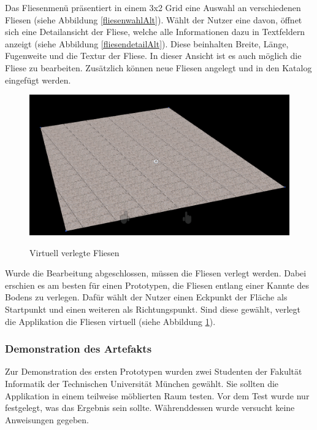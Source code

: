 Das Fliesenmenü präsentiert in einem 3x2 Grid eine Auswahl an verschiedenen Fliesen (siehe Abbildung \ref{fliesenwahlAlt}). Wählt der Nutzer eine davon, öffnet sich eine Detailansicht der Fliese, welche alle Informationen dazu in Textfeldern anzeigt (siehe Abbildung \ref{fliesendetailAlt}). Diese beinhalten Breite, Länge, Fugenweite und die Textur der Fliese. In dieser Ansicht ist es auch möglich die Fliese zu bearbeiten. Zusätzlich können neue Fliesen angelegt und in den Katalog eingefügt werden.

\begin{figure}[h]
	\begin{center}
		\noindent\includegraphics[scale=0.4]{Resources/Artefakt/bodenVerlegt.png}
		\label{bodenVerl}
		\caption{Virtuell verlegte Fliesen}	
	\end{center}
\end{figure}

Wurde die Bearbeitung abgeschlossen, müssen die Fliesen verlegt werden. Dabei erschien es am besten für einen Prototypen, die Fliesen entlang einer Kannte des Bodens zu verlegen. Dafür wählt der Nutzer einen Eckpunkt der Fläche als Startpunkt und einen weiteren als Richtungspunkt. Sind diese gewählt, verlegt die Applikation die Fliesen virtuell (siehe Abbildung \ref{bodenVerl}).

\subsubsection{Demonstration des Artefakts}

Zur Demonstration des ersten Prototypen wurden zwei Studenten der Fakultät Informatik der Technischen Universität München gewählt. Sie sollten die Applikation in einem teilweise möblierten Raum testen. Vor dem Test wurde nur festgelegt, was das Ergebnis sein sollte. Währenddessen wurde versucht keine Anweisungen gegeben.

